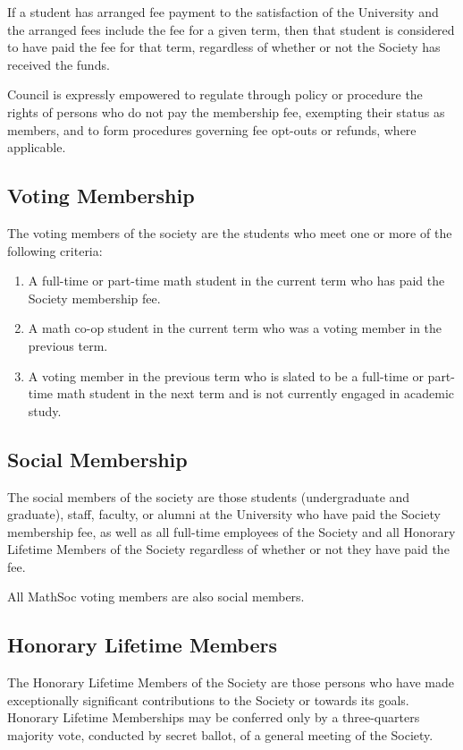 If a student has arranged fee payment to the satisfaction of the University and
the arranged fees include the fee for a given term, then that student is
considered to have paid the fee for that term, regardless of whether or not the
Society has received the funds.

Council is expressly empowered to regulate through policy or procedure the rights of
persons who do not pay the membership fee, exempting their status as members, and to form
procedures governing fee opt-outs or refunds, where applicable.

\subsection{Voting Membership}
The voting members of the society are the students who meet one or more
of the following criteria:
\begin{enumerate}
  \item A full-time or part-time math student in the current term who has paid the Society membership fee. 
  \item A math co-op student in the current term who was a voting member in the
    previous term.
  \item A voting member in the previous term who is slated to be a full-time or
    part-time math student in the next term and is not currently engaged in
    academic study.
\end{enumerate}

\subsection{Social Membership}
The social members of the society are those students (undergraduate and
graduate), staff, faculty, or alumni at the University who have paid the Society
membership fee, as well as all full-time employees of the Society and all
Honorary Lifetime Members of the Society regardless of whether or not they have
paid the fee.

All MathSoc voting members are also social members. 

\subsection{Honorary Lifetime Members}
The Honorary Lifetime Members of the Society are those persons who have made
exceptionally significant contributions to the Society or towards its goals.
Honorary Lifetime Memberships may be conferred only by a three-quarters majority
vote, conducted by secret ballot, of a general meeting of the Society.

